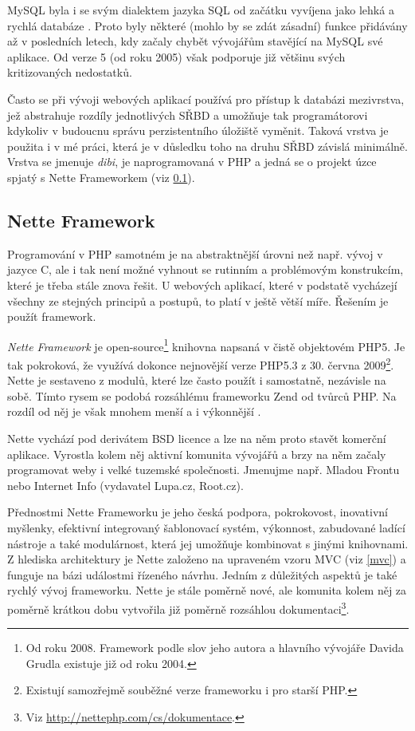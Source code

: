 MySQL byla i se svým dialektem jazyka SQL od začátku vyvíjena jako
lehká a rychlá databáze \cite{sql}. Proto byly některé (mohlo by se
zdát zásadní) funkce přidávány až v posledních letech, kdy začaly chybět vývojářům
stavějící na MySQL své aplikace. Od verze 5 (od roku 2005) však
podporuje již většinu svých kritizovaných nedostatků.

Často se při vývoji webových aplikací používá pro přístup k databázi
mezivrstva, jež abstrahuje rozdíly jednotlivých SŘBD a umožňuje tak
programátorovi kdykoliv v budoucnu správu perzistentního úložiště
vyměnit. Taková vrstva je použita i v mé práci, která je v důsledku
toho na druhu SŘBD závislá minimálně. Vrstva se jmenuje {\it dibi},
je naprogramovaná v PHP a jedná se o projekt úzce spjatý s Nette
Frameworkem (viz \ref{nette}).

\subsection{Nette Framework}\label{nette}
Programování v PHP samotném je na abstraktnější úrovni než např.
vývoj v jazyce C, ale i tak není možné vyhnout se rutinním a
problémovým konstrukcím, které je třeba stále znova řešit. U webových
aplikací, které v podstatě vycházejí všechny ze stejných principů a
postupů, to platí v ještě větší míře. Řešením je použít framework.

{\it Nette Framework} je open-source\footnote{Od roku 2008. Framework
podle slov jeho autora a hlavního vývojáře Davida Grudla existuje již od
roku 2004.} knihovna napsaná v čistě objektovém PHP5. Je tak
pokroková, že využívá dokonce nejnovější verze PHP5.3 z 30. června
2009\footnote{Existují samozřejmě souběžné verze frameworku i pro
starší PHP.}. Nette je sestaveno z modulů, které lze často použít i
samostatně, nezávisle na sobě. Tímto rysem se podobá rozsáhlému
frameworku Zend od tvůrců PHP. Na rozdíl od něj je však mnohem menší
a i výkonnější \cite{netteTest} \cite{netteCo}.

Nette vychází pod derivátem BSD licence a lze na něm proto stavět
komerční aplikace. Vyrostla kolem něj aktivní komunita vývojářů a brzy
na něm začaly programovat weby i velké tuzemské společnosti. Jmenujme
např. Mladou Frontu nebo Internet Info (vydavatel Lupa.cz, Root.cz).

Přednostmi Nette Frameworku je jeho česká podpora,
pokrokovost, inovativní myšlenky, efektivní integrovaný šablonovací
systém, výkonnost, zabudované ladící nástroje a také modulárnost,
která jej umožňuje kombinovat s jinými knihovnami. Z hlediska
architektury je Nette založeno na upraveném vzoru MVC (viz \ref{mvc})
a funguje na bázi událostmi řízeného návrhu. Jedním z důležitých aspektů je také
rychlý vývoj frameworku. Nette je stále poměrně nové, ale komunita
kolem něj za poměrně krátkou dobu vytvořila již poměrně rozsáhlou
dokumentaci\footnote{Viz \url{http://nettephp.com/cs/dokumentace}.}.
\cite{netteProc}

